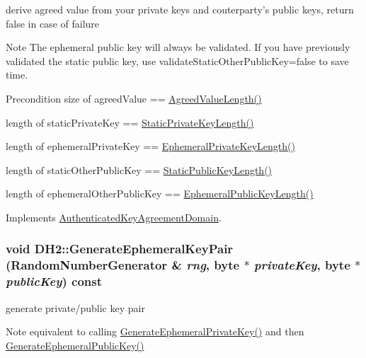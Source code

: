 derive agreed value from your private keys and couterparty's public keys, return false in case of failure \begin{DoxyNote}{Note}
The ephemeral public key will always be validated. If you have previously validated the static public key, use validateStaticOtherPublicKey=false to save time. 
\end{DoxyNote}
\begin{DoxyPrecond}{Precondition}
size of agreedValue == \hyperlink{class_d_h2_a403d4258cc4c99fb00c921a7e85de660}{AgreedValueLength()} 

length of staticPrivateKey == \hyperlink{class_d_h2_aed4126a3c1c6dc8c800ca7802e12f8f9}{StaticPrivateKeyLength()} 

length of ephemeralPrivateKey == \hyperlink{class_d_h2_adf142bd312b462c1fb1c8c2078fae3fc}{EphemeralPrivateKeyLength()} 

length of staticOtherPublicKey == \hyperlink{class_d_h2_ac4f0631532ad65475f53dd3710c6901c}{StaticPublicKeyLength()} 

length of ephemeralOtherPublicKey == \hyperlink{class_d_h2_adf9a6b522bd06c40254ceffab14e429c}{EphemeralPublicKeyLength()} 
\end{DoxyPrecond}


Implements \hyperlink{class_authenticated_key_agreement_domain_ac9808fb56eacee0c08a9bbd22fe2c98e}{AuthenticatedKeyAgreementDomain}.\hypertarget{class_d_h2_a4b5a84bf47e9a18348521b5a9c752cce}{
\subsubsection[{GenerateEphemeralKeyPair}]{\setlength{\rightskip}{0pt plus 5cm}void DH2::GenerateEphemeralKeyPair ({\bf RandomNumberGenerator} \& {\em rng}, \/  byte $\ast$ {\em privateKey}, \/  byte $\ast$ {\em publicKey}) const}}
\label{class_d_h2_a4b5a84bf47e9a18348521b5a9c752cce}


generate private/public key pair \begin{DoxyNote}{Note}
equivalent to calling \hyperlink{class_d_h2_ab0e10e700f4461005b386a53ca37e7f8}{GenerateEphemeralPrivateKey()} and then \hyperlink{class_d_h2_ab8f69e52f50794ca51774f671cfa45da}{GenerateEphemeralPublicKey()} 
\end{DoxyNote}


